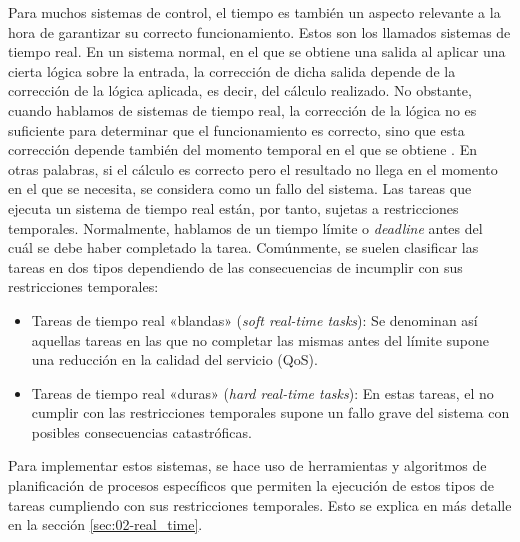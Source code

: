 Para muchos sistemas de control, el tiempo es también un aspecto relevante a la
hora de garantizar su correcto funcionamiento. Estos son los llamados sistemas
de tiempo real. En un sistema normal, en el que se obtiene una salida al aplicar
una cierta lógica sobre la entrada, la corrección de dicha salida depende de la
corrección de la lógica aplicada, es decir, del cálculo realizado. No obstante,
cuando hablamos de sistemas de tiempo real, la corrección de la lógica no es
suficiente para determinar que el funcionamiento es correcto, sino que esta
corrección depende también del momento temporal en el que se obtiene
\cite{gambier_real-time_2004}. En otras palabras, si el cálculo es correcto pero
el resultado no llega en el momento en el que se necesita, se considera como un
fallo del sistema. Las tareas que ejecuta un sistema de tiempo real están, por
tanto, sujetas a restricciones temporales. Normalmente, hablamos de un tiempo
límite o \textit{deadline} antes del cuál se debe haber completado la tarea.
Comúnmente, se suelen clasificar las tareas en dos tipos dependiendo de las
consecuencias de incumplir con sus restricciones temporales:

\begin{itemize}
  \item Tareas de tiempo real «blandas» (\textit{soft real-time tasks}): Se
        denominan así aquellas tareas en las que no completar las mismas antes
        del límite supone una reducción en la calidad del servicio (QoS).
  \item Tareas de tiempo real «duras» (\textit{hard real-time tasks}): En estas
        tareas, el no cumplir con las restricciones temporales supone un fallo
        grave del sistema con posibles consecuencias catastróficas.
\end{itemize}

Para implementar estos sistemas, se hace uso de herramientas y algoritmos de
planificación de procesos específicos que permiten la ejecución de estos tipos
de tareas cumpliendo con sus restricciones temporales. Esto se explica en más
detalle en la sección \ref{sec:02-real_time}.

